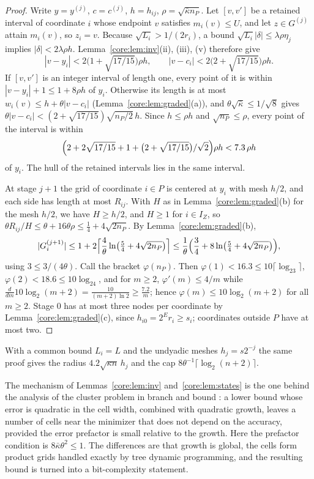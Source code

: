 \begin{proof}
Write $y=y^{(j)}$, $c=c^{(j)}$, $h=h_{ij}$, $\rho=\sqrt{\bar\kappa n_P}$. Let
$[v,v']$ be a retained interval of coordinate $i$ whose endpoint $v$ satisfies
$m_i(v)\le U$, and let $z\in G^{(j)}$ attain $m_i(v)$, so $z_i=v$. Because
$\sqrt{L_i}>1/(2r_i)$, a bound $\sqrt{L_i}|\delta|\le\lambda\rho\eta_j$
implies $|\delta|<2\lambda\rho h$. Lemma~\ref{core:lem:inv}(ii), (iii), (v)
therefore give
\[
|v-y_i|<2\bigl(1+\sqrt{17/15}\bigr)\rho h,\qquad
|v-c_i|<2\bigl(2+\sqrt{17/15}\bigr)\rho h.
\]
If $[v,v']$ is an integer interval of length one, every point of it is within
$|v-y_i|+1\le1+8\rho h$ of $y_i$. Otherwise its length is at most
$w_i(v)\le h+\theta|v-c_i|$ (Lemma~\ref{core:lem:graded}(a)), and
$\theta\sqrt{\bar\kappa}\le1/\sqrt8$ gives
$\theta|v-c_i|<(2+\sqrt{17/15})\sqrt{n_P/2}\,h$. Since $h\le\rho h$ and
$\sqrt{n_P}\le\rho$, every point of the interval is within
\[
\Bigl(2+2\sqrt{17/15}+1+\bigl(2+\sqrt{17/15}\bigr)/\sqrt2\Bigr)\rho h
<7.3\,\rho h
\]
of $y_i$. The hull of the retained intervals lies in the same interval.

At stage $j+1$ the grid of coordinate $i\in P$ is centered at $y_i$ with mesh
$h/2$, and each side has length at most $R_{ij}$. With $H$ as in
Lemma~\ref{core:lem:graded}(b) for the mesh $h/2$, we have $H\ge h/2$, and
$H\ge1$ for $i\in I_Z$, so
$\theta R_{ij}/H\le\theta+16\theta\rho\le\frac14+4\sqrt{2n_P}$. By
Lemma~\ref{core:lem:graded}(b),
\[
|G_i^{(j+1)}|\le1+2\Bigl\lceil\frac4\theta\ln\bigl(\tfrac54+4\sqrt{2n_P}\bigr)\Bigr\rceil
\le\frac1\theta\Bigl(\frac34+8\ln\bigl(\tfrac54+4\sqrt{2n_P}\bigr)\Bigr),
\]
using $3\le3/(4\theta)$. Call the bracket $\varphi(n_P)$. Then
$\varphi(1)<16.3\le10\lceil\log_23\rceil$, $\varphi(2)<18.6\le10\log_24$, and
for $m\ge2$, $\varphi'(m)\le4/m$ while
$\frac{d}{dm}10\log_2(m+2)=\frac{10}{(m+2)\ln2}\ge\frac{7.2}m$; hence
$\varphi(m)\le10\log_2(m+2)$ for all $m\ge2$. Stage $0$ has at most three nodes
per coordinate by Lemma~\ref{core:lem:graded}(c), since $h_{i0}=2^Er_i\ge s_i$;
coordinates outside $P$ have at most two.
\end{proof}

With a common bound $L_i=L$ and the undyadic meshes $h_j=s2^{-j}$ the same
proof gives the radius $4.2\sqrt{\kappa n}\,h_j$ and the cap
$8\theta^{-1}\lceil\log_2(n+2)\rceil$.

\begin{remark}\label{core:rem:cluster}
The mechanism of Lemmas~\ref{core:lem:inv} and~\ref{core:lem:states} is the
one behind the analysis of the cluster problem in branch and bound
\cite{DuKearfott1994,WechsungSchaberBarton2014}: a lower bound whose error is
quadratic in the cell width, combined with quadratic growth, leaves a number of
cells near the minimizer that does not depend on the accuracy, provided the
error prefactor is small relative to the growth. Here the prefactor condition
is $8\bar\kappa\theta^2\le1$. The differences are that growth is global,
the cells form product grids handled exactly by tree dynamic programming, and
the resulting bound is turned into a bit-complexity statement.
\end{remark}

